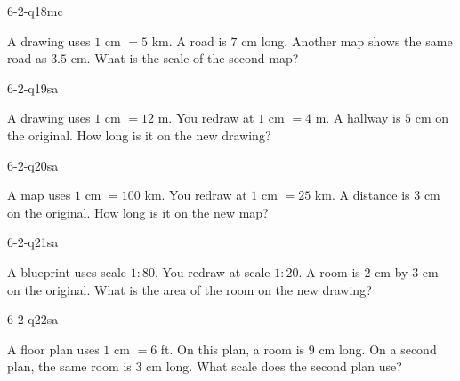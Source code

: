 \begin{practiceQuestion}{6-2-q18}{mc}
\begin{questionText}
A drawing uses $1$ cm $= 5$ km. A road is $7$ cm long. Another map shows the same road as $3.5$ cm. What is the scale of the second map?
\end{questionText}
\end{practiceQuestion}


\begin{practiceQuestion}{6-2-q19}{sa}
\begin{questionText}
A drawing uses $1$ cm $= 12$ m. You redraw at $1$ cm $= 4$ m. A hallway is $5$ cm on the original. How long is it on the new drawing?
\end{questionText}
\end{practiceQuestion}

\begin{practiceQuestion}{6-2-q20}{sa}
\begin{questionText}
A map uses $1$ cm $= 100$ km. You redraw at $1$ cm $= 25$ km. A distance is $3$ cm on the original. How long is it on the new map?
\end{questionText}
\end{practiceQuestion}

\begin{practiceQuestion}{6-2-q21}{sa}
\begin{questionText}
A blueprint uses scale $1:80$. You redraw at scale $1:20$. A room is $2$ cm by $3$ cm on the original. What is the area of the room on the new drawing?
\end{questionText}
\end{practiceQuestion}

\begin{practiceQuestion}{6-2-q22}{sa}
\begin{questionText}
A floor plan uses $1$ cm $= 6$ ft. On this plan, a room is $9$ cm long. On a second plan, the same room is $3$ cm long. What scale does the second plan use?
\end{questionText}
\end{practiceQuestion}

